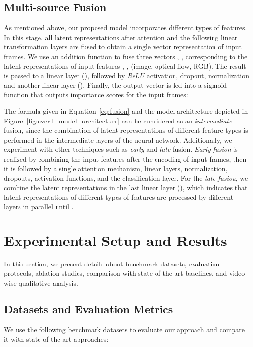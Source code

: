 \documentclass{article}
\begin{document}
\subsection{Multi-source Fusion}

As mentioned above, our proposed model incorporates different types of features. In this stage, all latent representations  after attention and the following linear transformation layers are fused to obtain a single vector representation of input frames. We use an addition function to fuse three vectors , ,  corresponding to the latent representations of input features , ,  (image, optical flow, RGB). The result is passed to a linear layer (), followed by \emph{ReLU} activation, dropout, normalization and another linear layer (). Finally, the output vector is fed into a sigmoid function that outputs importance scores  for the input frames:



The formula given in Equation~\ref{eq:fusion} and the model architecture depicted in Figure~\ref{fig:overll_model_architecture} can be considered as an \textit{intermediate} fusion, since the combination of latent representations of different feature types is performed in the intermediate layers of the neural network. Additionally, we experiment with other techniques such as \textit{early} and \textit{late} fusion. \textit{Early fusion} is realized by combining the input features  after the encoding of input frames, then it is followed by a single attention mechanism, linear layers, normalization, dropouts, activation functions, and the classification layer. For the \textit{late fusion}, we combine the latent representations in the last linear layer (), which indicates that latent representations of different types of features are processed by different layers in parallel until .


\section{Experimental Setup and Results}\label{sec:experiments}

In this section, we present details about benchmark datasets, evaluation protocols, ablation studies, comparison with state-of-the-art baselines, and video-wise qualitative analysis.

\subsection{Datasets and Evaluation Metrics}
We use the following benchmark datasets to evaluate our approach and compare it with state-of-the-art approaches:
\end{document}
